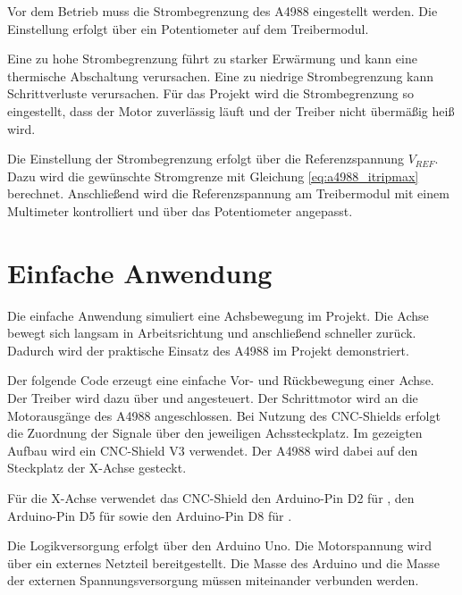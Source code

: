 Vor dem Betrieb muss die Strombegrenzung des A4988 eingestellt werden. 
Die Einstellung erfolgt über ein Potentiometer auf dem Treibermodul.

Eine zu hohe Strombegrenzung führt zu starker Erwärmung und kann eine thermische Abschaltung verursachen. 
Eine zu niedrige Strombegrenzung kann Schrittverluste verursachen. 
Für das Projekt wird die Strombegrenzung so eingestellt, dass der Motor zuverlässig läuft und der Treiber nicht übermäßig heiß wird.

Die Einstellung der Strombegrenzung erfolgt über die Referenzspannung \(V_{REF}\). 
Dazu wird die gewünschte Stromgrenze mit Gleichung \ref{eq:a4988_itripmax} berechnet. 
Anschließend wird die Referenzspannung am Treibermodul mit einem Multimeter kontrolliert und über das Potentiometer angepasst.

\section{Einfache Anwendung}

Die einfache Anwendung simuliert eine Achsbewegung im Projekt. 
Die Achse bewegt sich langsam in Arbeitsrichtung und anschließend schneller zurück. 
Dadurch wird der praktische Einsatz des A4988 im Projekt demonstriert.

Der folgende Code erzeugt eine einfache Vor- und Rückbewegung einer Achse. 
Der Treiber wird dazu über  und  angesteuert. 
Der Schrittmotor wird an die Motorausgänge des A4988 angeschlossen. 
Bei Nutzung des CNC-Shields erfolgt die Zuordnung der Signale über den jeweiligen Achssteckplatz.
Im gezeigten Aufbau wird ein CNC-Shield V3 verwendet. 
Der A4988 wird dabei auf den Steckplatz der X-Achse gesteckt.

Für die X-Achse verwendet das CNC-Shield den Arduino-Pin D2 für , den Arduino-Pin D5 für  sowie den Arduino-Pin D8 für .

Die Logikversorgung erfolgt über den Arduino Uno. 
Die Motorspannung wird über ein externes Netzteil bereitgestellt. 
Die Masse des Arduino und die Masse der externen Spannungsversorgung müssen miteinander verbunden werden.

\begin{code}[H]
	\label{Code:A4988ProjectAxis}
\end{code}

